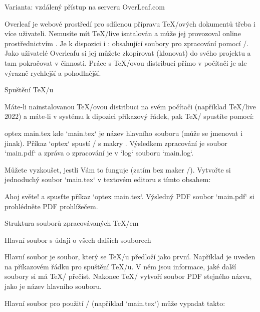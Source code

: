 {\secc[OverLeaf] Varianta: vzdálený přístup na serveru OverLeaf.com

Overleaf je webové prostředí pro sdílenou přípravu \TeX/ových dokumentů třeba i více uživateli. Nemusíte mít \TeX/live isntalován a může jej provozoval online prostřednictvím . Je k dispozici i \TODO:  obsahující soubory pro zpracování pomocí \OpBible/. Jako uživatelé Overleafu si jej můžete zkopírovat (klonovat) do svého projektu a tam pokračovat v činnosti. Práce s \TeX/ovou distribucí přímo v počítači je ale výrazně rychlejší a pohodlnější.






}

\sec Spuštění \TeX/u

Máte-li nainstalovanou \TeX/ovou distribuci na svém počítači (například \TeX/live
2022) %
a máte-li v systému k dipozici příkazový řádek, pak \TeX/ spustíte pomocí:

\begtt
optex main.tex
\endtt
kde `main.tex` je název hlavního souboru (může se jmenovat i jinak). 
Příkaz `optex` spustí \LuaTeX/ s makry \OpTeX. Výsledkem zpracování je soubor 
`main.pdf` a zpráva o zpracování je v `log` souboru `main.log`.

Můžete vyzkoušet, jestli Vám to funguje (zatím bez maker \OpBible/). Vytvořte si jednoduchý soubor `main.tex` v textovém editoru s tímto obsahem:

\begtt
\fontfam[lm]
Ahoj světe!
\bye
\endtt
a spusťte příkaz `optex main.tex`. Výsledný PDF soubor `main.pdf` si prohlédněte PDF prohlížečem.

\sec Struktura souborů zpracovávaných \TeX/em

\secc[hlavni] Hlavní soubor s údaji o všech dalších souborech

Hlavní soubor je soubor, který se \TeX/u předloží jako první. Například je
uveden na příkazovém řádku pro spuštění \TeX/u. V něm jsou informace, jaké
další soubory si má \TeX/ přečíst. Nakonec \TeX/ vytvoří soubor PDF stejného
názvu, jako je název hlavního souboru.

Hlavní soubor pro použití \OpBible/ (například `main.tex`) může vypadat takto:

\begtt
\load[opbible]  %
\cslang          %

